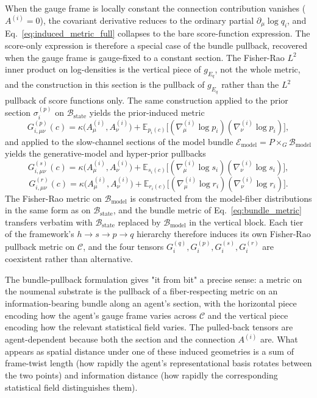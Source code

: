 \documentclass[11pt]{article}
\begin{document}
When the gauge frame is locally constant the connection contribution vanishes ($A^{(i)} = 0$), the covariant derivative reduces to the ordinary partial $\partial_\mu \log q_i$, and Eq.~\eqref{eq:induced_metric_full} collapses to the bare score-function expression. The score-only expression is therefore a special case of the bundle pullback, recovered when the gauge frame is gauge-fixed to a constant section. The Fisher-Rao $L^2$ inner product on log-densities is the vertical piece of $g_{E_q}$, not the whole metric, and the construction in this section is the pullback of $g_{E_q}$ rather than the $L^2$ pullback of score functions only. The same construction applied to the prior section $\sigma_i^{(p)}$ on $\mathcal{B}_{\mathrm{state}}$ yields the prior-induced metric
\begin{equation}
\boxed{G^{(p)}_{i,\mu\nu}(c) = \kappa\big(A^{(i)}_\mu, A^{(i)}_\nu\big) + \mathbb{E}_{p_i(c)}\big[(\nabla^{(i)}_\mu \log p_i)(\nabla^{(i)}_\nu \log p_i)\big],}
\end{equation}
and applied to the slow-channel sections of the model bundle $\mathcal{E}_{\mathrm{model}} = P \times_G \mathcal{B}_{\mathrm{model}}$ yields the generative-model and hyper-prior pullbacks
\begin{equation}
\boxed{G^{(s)}_{i,\mu\nu}(c) = \kappa\big(A^{(i)}_\mu, A^{(i)}_\nu\big) + \mathbb{E}_{s_i(c)}\big[(\nabla^{(i)}_\mu \log s_i)(\nabla^{(i)}_\nu \log s_i)\big],}
\end{equation}
\begin{equation}
G^{(r)}_{i,\mu\nu}(c) = \kappa\big(A^{(i)}_\mu, A^{(i)}_\nu\big) + \mathbb{E}_{r_i(c)}\big[(\nabla^{(i)}_\mu \log r_i)(\nabla^{(i)}_\nu \log r_i)\big].
\end{equation}
The Fisher-Rao metric on $\mathcal{B}_{\mathrm{model}}$ is constructed from the model-fiber distributions in the same form as on $\mathcal{B}_{\mathrm{state}}$, and the bundle metric of Eq.~\eqref{eq:bundle_metric} transfers verbatim with $\mathcal{B}_{\mathrm{state}}$ replaced by $\mathcal{B}_{\mathrm{model}}$ in the vertical block. Each tier of the framework's $h \to s \to p \to q$ hierarchy therefore induces its own Fisher-Rao pullback metric on $\mathcal{C}$, and the four tensors $G_i^{(q)}, G_i^{(p)}, G_i^{(s)}, G_i^{(r)}$ are coexistent rather than alternative.

The bundle-pullback formulation gives "it from bit" a precise sense: a metric on the noumenal substrate is the pullback of a fiber-respecting metric on an information-bearing bundle along an agent's section, with the horizontal piece encoding how the agent's gauge frame varies across $\mathcal{C}$ and the vertical piece encoding how the relevant statistical field varies. The pulled-back tensors are agent-dependent because both the section and the connection $A^{(i)}$ are. What appears as spatial distance under one of these induced geometries is a sum of frame-twist length (how rapidly the agent's representational basis rotates between the two points) and information distance (how rapidly the corresponding statistical field distinguishes them).
\end{document}
